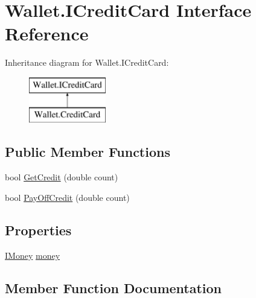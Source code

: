 \hypertarget{interface_wallet_1_1_i_credit_card}{}\section{Wallet.\+I\+Credit\+Card Interface Reference}
\label{interface_wallet_1_1_i_credit_card}
Inheritance diagram for Wallet.\+I\+Credit\+Card\+:\begin{figure}[H]
\begin{center}
\leavevmode
\includegraphics[height=2.000000cm]{interface_wallet_1_1_i_credit_card}
\end{center}
\end{figure}
\subsection*{Public Member Functions}
\begin{DoxyCompactItemize}
\item 
bool \hyperlink{interface_wallet_1_1_i_credit_card_aea5932ad7afdb08ee961fc0fcf694ab1}{Get\+Credit} (double count)
\item 
bool \hyperlink{interface_wallet_1_1_i_credit_card_a8b7eadc0c901e4560f244d28b59e32bf}{Pay\+Off\+Credit} (double count)
\end{DoxyCompactItemize}
\subsection*{Properties}
\begin{DoxyCompactItemize}
\item 
\hyperlink{interface_wallet_1_1_i_money}{I\+Money} \hyperlink{interface_wallet_1_1_i_credit_card_a609b2ca54cc81d132755a47442a81c7c}{money}
\end{DoxyCompactItemize}


\subsection{Member Function Documentation}
\hypertarget{interface_wallet_1_1_i_credit_card_aea5932ad7afdb08ee961fc0fcf694ab1}{}\label{interface_wallet_1_1_i_credit_card_aea5932ad7afdb08ee961fc0fcf694ab1} 
